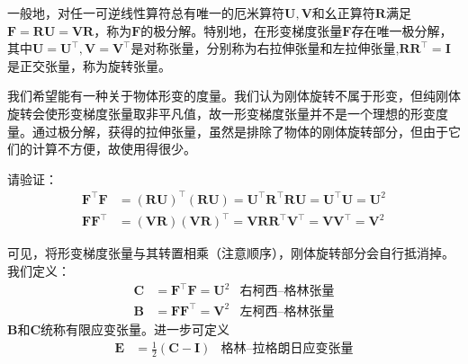 \documentclass[main.tex]{subfiles}
\begin{document}
一般地，对任一可逆线性算符总有唯一的厄米算符$\mathbf{U},\mathbf{V}$和幺正算符$\mathbf{R}$满足$\mathbf{F}=\mathbf{RU}=\mathbf{VR}$，称为$\mathbf{F}$的极分解。特别地，在形变梯度张量$\mathbf{F}$存在唯一极分解，其中$\mathbf{U}=\mathbf{U}^\intercal,\mathbf{V}=\mathbf{V}^\intercal$是对称张量，分别称为右拉伸张量和左拉伸张量,$\mathbf{RR}^\intercal=\mathbf{I}$是正交张量，称为旋转张量。

我们希望能有一种关于物体形变的度量。我们认为刚体旋转不属于形变，但纯刚体旋转会使形变梯度张量取非平凡值，故一形变梯度张量并不是一个理想的形变度量。通过极分解，获得的拉伸张量，虽然是排除了物体的刚体旋转部分，但由于它们的计算不方便，故使用得很少。

\begin{example}
请验证：
\begin{align*}
\mathbf{F}^\intercal\mathbf{F}&=\left(\mathbf{RU}\right)^\intercal\left(\mathbf{RU}\right)=\mathbf{U}^\intercal\mathbf{R}^\intercal\mathbf{RU}=\mathbf{U}^\intercal\mathbf{U}=\mathbf{U}^2\\
\mathbf{FF}^\intercal&=\left(\mathbf{VR}\right)\left(\mathbf{VR}\right)^\intercal=\mathbf{VRR}^\intercal\mathbf{V}^\intercal=\mathbf{VV}^\intercal=\mathbf{V}^2
\end{align*}
\end{example}

可见，将形变梯度张量与其转置相乘（注意顺序），刚体旋转部分会自行抵消掉。我们定义：
\begin{align*}
    \mathbf{C}&=\mathbf{F}^\intercal\mathbf{F}=\mathbf{U}^2&\text{右柯西--格林张量}\\
    \mathbf{B}&=\mathbf{FF}^\intercal=\mathbf{V}^2&\text{左柯西--格林张量}
\end{align*}
$\mathbf{B}$和$\mathbf{C}$统称有限应变张量。进一步可定义
\begin{align*}
    \mathbf{E}&=\frac{1}{2}\left(\mathbf{C}-\mathbf{I}\right)&\text{格林--拉格朗日应变张量}
\end{align*}
\end{document}
